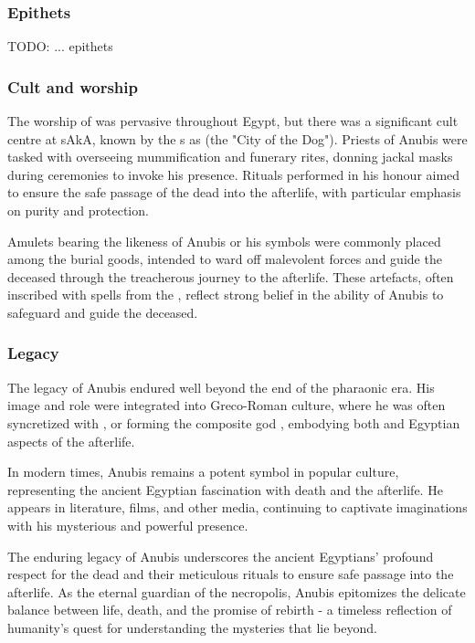 \subsubsection*{Epithets}

TODO: ... epithets

\subsubsection*{Cult and worship}
The worship of  was pervasive throughout Egypt, but there was a significant cult centre at sAkA, known by the s as  (the "City of the Dog"). Priests of Anubis were tasked with overseeing mummification and funerary rites, donning jackal masks during ceremonies to invoke his presence. Rituals performed in his honour aimed to ensure the safe passage of the dead into the afterlife, with particular emphasis on purity and protection.

Amulets bearing the likeness of Anubis or his symbols were commonly placed among the burial goods, intended to ward off malevolent forces and guide the deceased through the treacherous journey to the afterlife. These artefacts, often inscribed with spells from the , reflect strong belief in the ability of Anubis to safeguard and guide the deceased.

\subsubsection*{Legacy}
The legacy of Anubis endured well beyond the end of the pharaonic era. His image and role were integrated into Greco-Roman culture, where he was often syncretized with , or forming the composite god , embodying both  and Egyptian aspects of the afterlife.

In modern times, Anubis remains a potent symbol in popular culture, representing the ancient Egyptian fascination with death and the afterlife. He appears in literature, films, and other media, continuing to captivate imaginations with his mysterious and powerful presence.

The enduring legacy of Anubis underscores the ancient Egyptians' profound respect for the dead and their meticulous rituals to ensure safe passage into the afterlife. As the eternal guardian of the necropolis, Anubis epitomizes the delicate balance between life, death, and the promise of rebirth - a timeless reflection of humanity's quest for understanding the mysteries that lie beyond.

